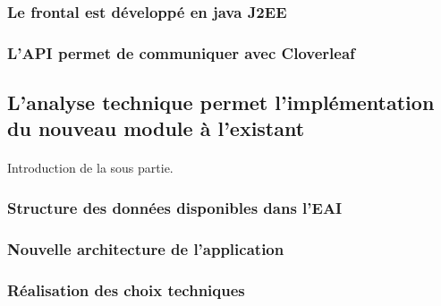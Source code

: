 			\paragraph{}%
			
		\subsubsection{Le frontal est développé en java J2EE}
			\paragraph{}%
			
			\paragraph{}%
			
		\subsubsection{L'API permet de communiquer avec Cloverleaf}
			\paragraph{}%
	
	\subsection{L'analyse technique permet l'implémentation du nouveau module à l'existant}
		\paragraph{}
		Introduction de la sous partie.
		
		\subsubsection{Structure des données disponibles dans l'EAI}
		\subsubsection{Nouvelle architecture de l'application}
			
		\subsubsection{Réalisation des choix techniques}
